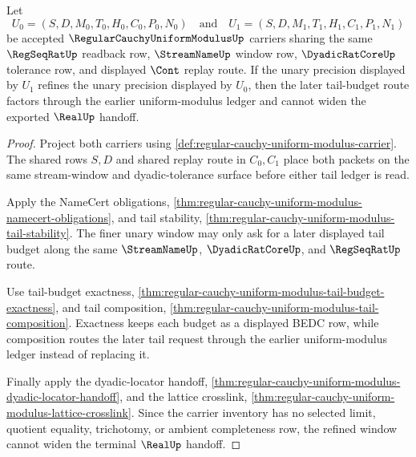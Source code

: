 \begin{theorem}
\label{thm:regular-cauchy-uniform-modulus-window-refinement}
Let
$$
U_0=(S,D,M_0,T_0,H_0,C_0,P_0,N_0)
\quad\text{and}\quad
U_1=(S,D,M_1,T_1,H_1,C_1,P_1,N_1)
$$
be accepted $\RegularCauchyUniformModulusUp$ carriers sharing the same $\RegSeqRatUp$ readback row, $\StreamNameUp$ window row, $\DyadicRatCoreUp$ tolerance row, and displayed $\Cont$ replay route. If the unary precision displayed by $U_1$ refines the unary precision displayed by $U_0$, then the later tail-budget route factors through the earlier uniform-modulus ledger and cannot widen the exported $\RealUp$ handoff.
\end{theorem}
\begin{proof}
Project both carriers using \autoref{def:regular-cauchy-uniform-modulus-carrier}. The shared rows $S,D$ and shared replay route in $C_0,C_1$ place both packets on the same stream-window and dyadic-tolerance surface before either tail ledger is read.

Apply the NameCert obligations, \autoref{thm:regular-cauchy-uniform-modulus-namecert-obligations}, and tail stability, \autoref{thm:regular-cauchy-uniform-modulus-tail-stability}. The finer unary window may only ask for a later displayed tail budget along the same $\StreamNameUp$, $\DyadicRatCoreUp$, and $\RegSeqRatUp$ route.

Use tail-budget exactness, \autoref{thm:regular-cauchy-uniform-modulus-tail-budget-exactness}, and tail composition, \autoref{thm:regular-cauchy-uniform-modulus-tail-composition}. Exactness keeps each budget as a displayed BEDC row, while composition routes the later tail request through the earlier uniform-modulus ledger instead of replacing it.

Finally apply the dyadic-locator handoff, \autoref{thm:regular-cauchy-uniform-modulus-dyadic-locator-handoff}, and the lattice crosslink, \autoref{thm:regular-cauchy-uniform-modulus-lattice-crosslink}. Since the carrier inventory has no selected limit, quotient equality, trichotomy, or ambient completeness row, the refined window cannot widen the terminal $\RealUp$ handoff.
\end{proof}


